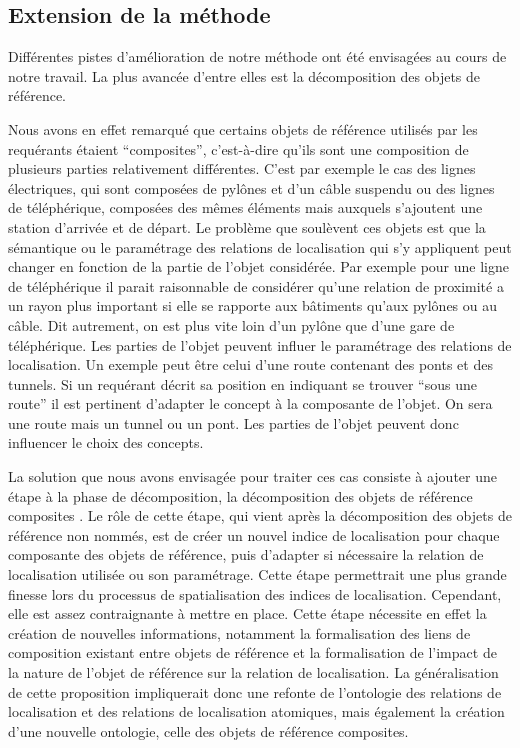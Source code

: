 \subsection*{Extension de la méthode}

Différentes pistes d'amélioration de notre méthode ont été envisagées
au cours de notre travail. La plus avancée d'entre elles est la
décomposition des objets de référence.

Nous avons en effet remarqué que certains objets de référence utilisés
par les requérants étaient \enquote{composites}, c'est-à-dire qu'ils
sont une composition de plusieurs parties relativement
différentes. C'est par exemple le cas des lignes électriques, qui sont
composées de pylônes et d'un câble suspendu ou des lignes de
téléphérique, composées des mêmes éléments mais auxquels s'ajoutent
une station d'arrivée et de départ. Le problème que soulèvent ces
objets est que la sémantique ou le paramétrage des relations de
localisation qui s'y appliquent peut changer en fonction de la partie
de l'objet considérée. Par exemple pour une ligne de téléphérique il
parait raisonnable de considérer qu'une relation de proximité a un
rayon plus important si elle se rapporte aux bâtiments qu'aux pylônes
ou au câble. Dit autrement, on est plus vite loin d'un pylône que
d'une gare de téléphérique. Les parties de l'objet peuvent influer le
paramétrage des relations de localisation. Un exemple peut être celui
d'une route contenant des ponts et des tunnels. Si un requérant décrit
sa position en indiquant se trouver \enquote{sous une route} il est
pertinent d'adapter le concept à la composante de l'objet. On sera
 une route mais
 un tunnel ou un pont. Les parties de
l'objet peuvent donc influencer le choix des concepts.

La solution que nous avons envisagée pour traiter ces cas consiste à
ajouter une étape à la phase de décomposition, la décomposition des
objets de référence composites \autocite{Bunel2019a}. Le rôle de cette
étape, qui vient après la décomposition des objets de référence non
nommés, est de créer un nouvel indice de localisation pour chaque
composante des objets de référence, puis d’adapter si nécessaire la
relation de localisation utilisée ou son paramétrage. Cette étape
permettrait une plus grande finesse lors du processus de
spatialisation des indices de localisation. Cependant, elle est assez
contraignante à mettre en place. Cette étape nécessite en effet la
création de nouvelles informations, notamment la formalisation des
liens de composition existant entre objets de référence et la
formalisation de l'impact de la nature de l'objet de référence sur la
relation de localisation. La généralisation de cette proposition
impliquerait donc une refonte de l'ontologie des relations de
localisation et des relations de localisation atomiques, mais
également la création d'une nouvelle ontologie, celle des objets de
référence composites.


